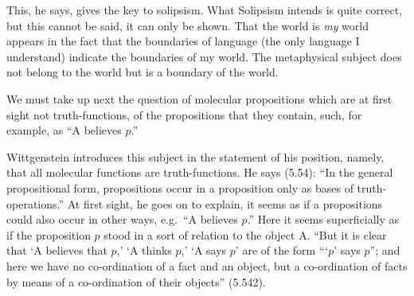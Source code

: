 This, he says, gives the key to solipsism. What Solipsism intends is quite correct, but this cannot be said, it can only be shown. That the world is \emph{my} world appears in the fact that the boundaries of language (the only language I understand) indicate the boundaries of my world. The metaphysical subject does not belong to the world but is a boundary of the world.

We must take up next the question of molecular propositions which are at first sight not truth-functions, of the propositions that they contain, such, for example, as “A believes $p$.”

Wittgenstein introduces this subject in the statement of his position, namely, that all molecular functions are truth-functions. He says (5.54): “In the general propositional form, propositions occur in a proposition only as bases of truth-operations.” At first sight, he goes on to explain, it seems as if a propositions could also occur in other ways, e.g.\ “A believes $p$.” Here it seems superficially as if the proposition $p$ stood in a sort of relation to the object A. “But it is clear that ‘A believes that $p$,’ ‘A thinks $p$,’ ‘A says $p$’ are of the form “‘$p$’ says $p$”; and here we have no co-ordination of a fact and an object, but a co-ordination of facts by means of a co-ordination of their objects” (5.542).

